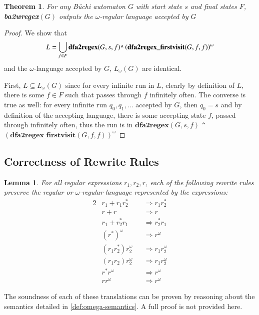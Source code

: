 \documentclass[preprint,12pt]{elsarticle}
\newtheorem{theorem}{Theorem}[section]
\newtheorem{lemma}{Lemma}[section]
\theoremstyle{definition}
\theoremstyle{remark}
\newcommand{\Buchi}{B\"{u}chi }
\begin{document}
\begin{theorem}
    For any \Buchi automaton $G$ with start state $s$ and final states $F$, \textbf{ba2wregex}$(G)$ outputs the $\omega$-regular language accepted by $G$
\end{theorem}
\begin{proof}
    We show that
    \[
        L = \bigcup_{f\in F} \textbf{dfa2regex}(G, s, f) \verb|^| \left(\textbf{dfa2regex\_firstvisit}(G, f, f)\right)^\omega
    \]
    and the $\omega$-language accepted by $G$, $L_\omega(G)$ are identical.

    First, $L\subseteq L_\omega(G)$ since for every infinite run in $L$, clearly by definition of $L$, there is some $f\in F$ such that passes through $f$ infinitely often. The converse is true as well: for every infinite run $q_0, q_1, \dots$ accepted by $G$, then $q_0 = s$ and by definition of the accepting language, there is some accepting state $f$, passed through infinitely often, thus the run is in $\textbf{dfa2regex}(G, s, f)$ \verb|^| $\left(\textbf{dfa2regex\_firstvisit}(G, f, f)\right)^\omega$
\end{proof}
\subsection{Correctness of Rewrite Rules}
\begin{lemma}
    For all regular expressions $r_1, r_2, r$, each of the following rewrite rules preserve the regular or $\omega$-regular language represented by the expressions:
    \begin{alignat}{2}
        & r_1 + r_1r_2^* && \Longrightarrow r_1r_2^* \\
        & r + r && \Longrightarrow r \\
        & r_1 + r_2^*r_1 && \Longrightarrow r_2^*r_1 \\
        & (r^*)^{\omega} && \Longrightarrow r^{\omega} \\
        & (r_1r_2^*)r_2^{\omega} && \Longrightarrow r_1r_2^{\omega} \\
        & (r_1r_2)r_2^{\omega} && \Longrightarrow r_1r_2^{\omega} \\
        & r^*r^{\omega} && \Longrightarrow r^{\omega} \\
        & rr^{\omega} && \Longrightarrow r^{\omega}
    \end{alignat}
\end{lemma}

The soundness of each of these translations can be proven by reasoning about the  semantics detailed in \cref{def:omega-semantics}. A full proof is not provided here.
\end{document}
